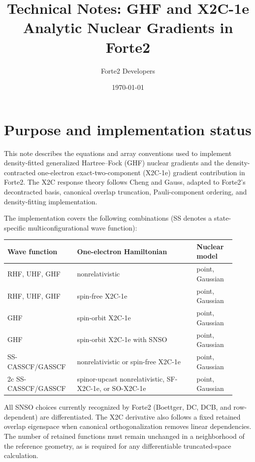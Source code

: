 \documentclass[aip,jcp,preprint]{revtex4-1}
\begin{document}
\title{Technical Notes: GHF and X2C-1e Analytic Nuclear Gradients in Forte2}
\author{Forte2 Developers}
\noaffiliation
\date{\today}
\maketitle

\section{Purpose and implementation status}

This note describes the equations and array conventions used to implement
density-fitted generalized Hartree--Fock (GHF) nuclear gradients and
the density-contracted one-electron exact-two-component (X2C-1e) gradient
contribution in Forte2.
The X2C response theory follows Cheng and Gauss,\cite{ChengGauss2011} adapted
to Forte2's decontracted basis, canonical overlap truncation, Pauli-component
ordering, and density-fitting implementation.

The implementation covers the following combinations (SS denotes a
state-specific multiconfigurational wave function):
\begin{center}
\small
\begin{tabular}{@{}>{\raggedright\arraybackslash}p{0.27\linewidth}
                    >{\raggedright\arraybackslash}p{0.49\linewidth}
                    >{\raggedright\arraybackslash}p{0.16\linewidth}@{}}
\toprule
Wave function & One-electron Hamiltonian & Nuclear model \\
\midrule
RHF, UHF, GHF & nonrelativistic & point, Gaussian \\
RHF, UHF, GHF & spin-free X2C-1e & point, Gaussian \\
GHF & spin-orbit X2C-1e & point, Gaussian \\
GHF & spin-orbit X2C-1e with SNSO & point, Gaussian \\
SS-CASSCF/GASSCF & nonrelativistic or spin-free X2C-1e & point, Gaussian \\
2c SS-CASSCF/GASSCF & spinor-upcast nonrelativistic, SF-X2C-1e, or SO-X2C-1e & point, Gaussian \\
\bottomrule
\end{tabular}
\end{center}
All SNSO choices currently recognized by Forte2 (Boettger, DC, DCB, and
row-dependent) are differentiated.  The X2C derivative also follows a fixed
retained overlap eigenspace when canonical orthogonalization removes linear
dependencies.  The number of retained functions must remain unchanged in a
neighborhood of the reference geometry, as is required for any differentiable
truncated-space calculation.
\end{document}
